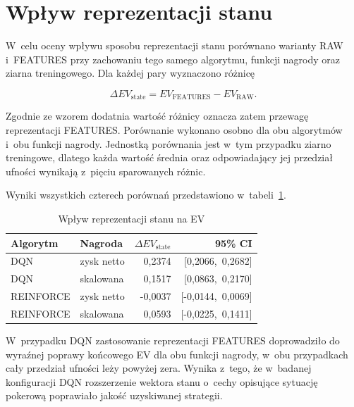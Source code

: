 \section{Wpływ reprezentacji stanu}
\label{sec:wyniki-reprezentacja-stanu}

W~celu oceny wpływu sposobu reprezentacji stanu porównano warianty
RAW i~FEATURES przy zachowaniu tego samego algorytmu, funkcji nagrody
oraz ziarna treningowego. Dla każdej pary wyznaczono różnicę

\begin{equation}
    \Delta EV_{\mathrm{state}}
    =
    EV_{\mathrm{FEATURES}}
    -
    EV_{\mathrm{RAW}}.
\end{equation}

Zgodnie ze wzorem dodatnia wartość różnicy oznacza zatem przewagę reprezentacji
FEATURES. Porównanie wykonano osobno dla obu algorytmów i~obu funkcji
nagrody. Jednostką porównania jest w~tym przypadku ziarno treningowe,
dlatego każda wartość średnia oraz odpowiadający jej przedział ufności
wynikają z~pięciu sparowanych różnic.

Wyniki wszystkich czterech porównań przedstawiono
w~tabeli~\ref{tab:state-representation-effect}.

\begin{table}[htbp]
    \centering
    \caption{Wpływ reprezentacji stanu na EV}
    \label{tab:state-representation-effect}
    \begin{tabular}{llrr}
        \toprule
        Algorytm & Nagroda & $\Delta EV_{\mathrm{state}}$ & 95\% CI \\
        \midrule
        DQN & zysk netto
            & 0{,}2374 & [0{,}2066,\ 0{,}2682] \\
        DQN & skalowana
            & 0{,}1517 & [0{,}0863,\ 0{,}2170] \\
        \midrule
        REINFORCE & zysk netto
            & -0{,}0037 & [-0{,}0144,\ 0{,}0069] \\
        REINFORCE & skalowana
            & 0{,}0593 & [-0{,}0225,\ 0{,}1411] \\
        \bottomrule
    \end{tabular}
\end{table}

W~przypadku DQN zastosowanie reprezentacji FEATURES doprowadziło do
wyraźnej poprawy końcowego EV dla obu funkcji nagrody, w~obu przypadkach
cały przedział ufności leży powyżej zera. Wynika z~tego, że w~badanej
konfiguracji DQN rozszerzenie wektora stanu o~cechy opisujące sytuację
pokerową poprawiało jakość uzyskiwanej strategii.

